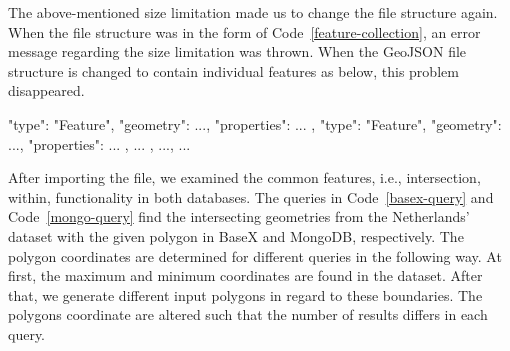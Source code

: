 \documentclass[a4paper,12pt]{article}
\begin{document}
The above-mentioned size limitation made us to change the file structure again.
When the file structure was in the form of Code~\ref{feature-collection}, 
an error message regarding the size limitation was thrown. 
When the GeoJSON file structure is changed to contain individual features as below,
this problem disappeared.
\vspace{10px}
\begin{fakeXML}[label=features,caption=A GeoJSON file restructured regarding the size limitation]
    {
      "type": "Feature",
      "geometry": {...},
      "properties": {...}
    },
    {
      "type": "Feature",
      "geometry": {...},
      "properties": {...}
    }, 
    { ... }, ..., { ... }
\end{fakeXML}
\vspace{10px}
After importing the file, we examined the common features, i.e., intersection, within, 
functionality in both databases.
The queries in Code~\ref{basex-query} and Code~\ref{mongo-query} find the intersecting geometries from the Netherlands' dataset with the given polygon in BaseX and MongoDB, respectively. The polygon coordinates are determined for different queries in the following way. At first, the maximum and minimum coordinates are found in the dataset. After that, we generate different input polygons in regard to these boundaries. The polygons coordinate are altered such that the number of results differs in each query.
\vspace{10px}
\vspace{10px}
\end{document}
